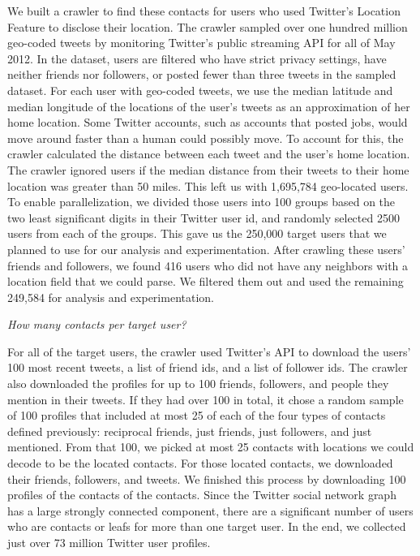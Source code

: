 We built a crawler to find these contacts for users who used Twitter's Location
Feature to disclose their location.
The crawler sampled over one hundred million geo-coded tweets by monitoring
Twitter's public streaming API for all of May 2012.
In the dataset, users are filtered who have strict privacy settings, have
neither friends nor followers, or posted fewer than three tweets in the sampled
dataset.
For each user with geo-coded tweets, we use the median latitude and median
longitude of the locations of the user's tweets as an approximation of her home
location.
Some Twitter accounts, such as accounts that posted jobs, would
move around faster than a human could possibly move.
To account for this, the crawler calculated the distance between each tweet and
the user's home location.
The crawler ignored users if the median distance from their tweets to their
home location was greater than 50 miles.
This left us with 1,695,784 geo-located users.
To enable parallelization, we divided those users into 100 groups based on
the two least significant digits in their Twitter user id, and randomly selected
2500 users from each of the groups.
%
This gave us the 250,000 target users that we planned to use for our
analysis and experimentation.
%
After crawling these users' friends and followers, we found 416 users who did
not have any neighbors with a location field that we could parse.
%
We filtered them out and used the remaining 249,584 for analysis and
experimentation.


\emph{How many contacts per target user?}

For all of the target users, the crawler used Twitter's API to download
the users' 100 most recent tweets, a list of friend ids, and a list of follower ids.
The crawler also downloaded the profiles for up to 100 friends, followers, and
people they mention in their tweets.
%
If they had over 100 in total, it chose a random sample of 100 profiles that
included at most 25 of each of the four types of contacts defined previously:
reciprocal friends, just friends, just followers, and just mentioned.
%
From that 100, we picked at most 25 contacts with locations we could decode to
be the located contacts. For those located contacts, we downloaded their
friends, followers, and tweets.
%
We finished this process by downloading 100 profiles of the contacts of the
contacts.
%
Since the Twitter social network graph has a large strongly connected
component, there are a significant number of users who are contacts or leafs for
more than one target user.
%
In the end, we collected just over 73 million Twitter user profiles.

